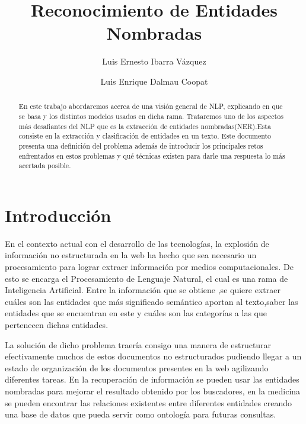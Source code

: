 \documentclass[runningheads]{llncs}
\begin{document}
%
\title{Reconocimiento de Entidades Nombradas}
%
%
\author{Luis Ernesto Ibarra Vázquez \and
Luis Enrique Dalmau Coopat}
%
%
%
\maketitle              %
%
\begin{abstract}

En este trabajo abordaremos acerca de una visión general de NLP, explicando en que se basa y los distintos modelos usados en dicha rama. Trataremos uno de los aspectos más desafiantes del NLP que es la extracción de entidades nombradas(NER).Esta consiste en la extracción y clasificación de entidades en un texto. Este documento presenta una definición del problema además de introducir los principales retos enfrentados en estos problemas y qué técnicas existen para darle una respuesta lo más acertada posible. 

\end{abstract}
%
%
%
\section{Introducción}

En el contexto actual con el desarrollo de las tecnologías, la explosión de información no estructurada en la web ha hecho que sea necesario un procesamiento para lograr extraer información por medios computacionales. De esto se encarga el Procesamiento de Lenguaje Natural, el cual es una rama de Inteligencia Artificial. Entre la información que se obtiene ,se quiere extraer cuáles son las entidades que más significado semántico aportan al texto,saber las entidades que se encuentran en este y cuáles son las categorías a las que pertenecen dichas entidades.

La solución de dicho problema traería consigo una manera de estructurar efectivamente muchos de estos documentos no estructurados pudiendo llegar a un estado de organización de los documentos presentes en la web agilizando diferentes tareas. En la recuperación de información se pueden usar las entidades nombradas para mejorar el resultado obtenido por los buscadores, en la medicina se pueden encontrar las relaciones existentes entre diferentes entidades creando una base de datos que pueda servir como ontología para futuras consultas.
\end{document}
